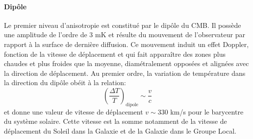 \paragraph{Dipôle} Le premier niveau d'anisotropie est constitué par le dipôle du CMB. Il possède une amplitude de l'ordre de 3 mK et résulte du mouvement de l'observateur par rapport à la surface de dernière diffusion. Ce mouvement induit un effet Doppler, fonction de la vitesse de déplacement et qui fait apparaître des zones plus chaudes et plus froides que la moyenne, diamétralement opposées et alignées avec la direction de déplacement. Au premier ordre, la variation de température dans la direction du dipôle obéit à la relation:
\begin{equation}
\left(\frac{\Delta T}{T}\right)_\mathrm{dipole}\sim \frac{v}{c}
\end{equation}
et donne une valeur de vitesse de déplacement $v\sim 330$ km/s pour le barycentre du système solaire. Cette vitesse est la somme notamment de la vitesse de déplacement du Soleil dans la Galaxie et de la Galaxie dans le Groupe Local.

